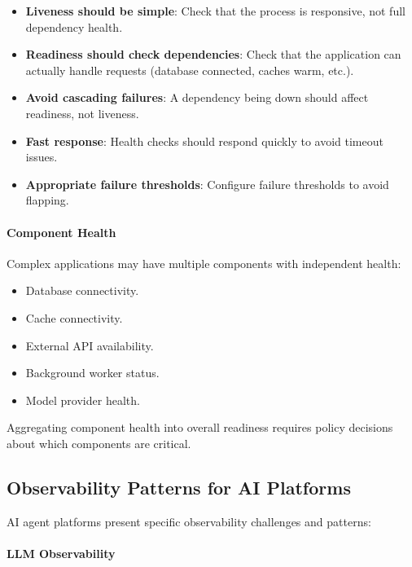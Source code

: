 \begin{itemize}
    \item \textbf{Liveness should be simple}: Check that the process is responsive, not full dependency health.
    
    \item \textbf{Readiness should check dependencies}: Check that the application can actually handle requests (database connected, caches warm, etc.).
    
    \item \textbf{Avoid cascading failures}: A dependency being down should affect readiness, not liveness.
    
    \item \textbf{Fast response}: Health checks should respond quickly to avoid timeout issues.
    
    \item \textbf{Appropriate failure thresholds}: Configure failure thresholds to avoid flapping.
\end{itemize}

\paragraph{Component Health}

Complex applications may have multiple components with independent health:
\begin{itemize}
    \item Database connectivity.
    \item Cache connectivity.
    \item External API availability.
    \item Background worker status.
    \item Model provider health.
\end{itemize}

Aggregating component health into overall readiness requires policy decisions about which components are critical.

\subsection{Observability Patterns for AI Platforms}

AI agent platforms present specific observability challenges and patterns:

\paragraph{LLM Observability}

